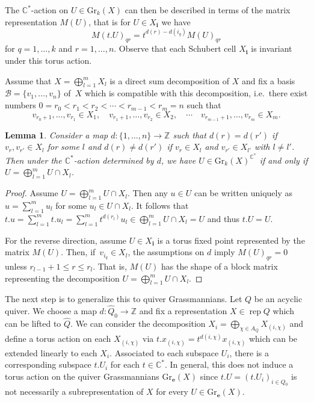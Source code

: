 \documentclass{amsart}
\newtheorem{lemma}[theorem]{Lemma}
\numberwithin{equation}{section}
\newcommand{\C}{\mathbb{C}}
\newcommand{\CC}{\mathbb{C}}
\newcommand{\ZZ}{\mathbb{Z}}
\newcommand{\bfe}{\mathbf{e}}
\newcommand{\bfi}{\mathbf{i}}
\newcommand{\Gr}{\mathrm{Gr}}
\newcommand{\rep}{\operatorname{rep}}
\begin{document}
The $\C^\ast$-action on $U\in\Gr_k(X)$ can then be described in terms of the matrix representation $M(U)$, that is for $U\in X_\bfi$ we have
\[M(t.U)_{qr}=t^{d(r)-d(i_q)} M(U)_{qr}\]
for $q=1,\ldots,k$ and $r=1,\ldots,n$.
Observe that each Schubert cell $X_\bfi$ is invariant under this torus action.

Assume that $X=\bigoplus_{l=1}^m X_l$ is a direct sum decomposition of $X$ and fix a basis $\mathcal B=\{v_1,\ldots,v_n\}$ of~$X$ which is compatible with this decomposition, i.e.\ there exist numbers $0=r_0<r_1<r_2<\cdots<r_{m-1}<r_m=n$ such that
\[v_{r_0+1},\ldots,v_{r_1}\in X_1,\quad v_{r_1+1},\ldots,v_{r_2}\in X_2,\quad\cdots\quad v_{r_{m-1}+1},\ldots,v_{r_m}\in X_m.\]
\begin{lemma}
  \label{le:usualGrass}
  Consider a map $d:\{1,\ldots,n\}\to\ZZ$ such that $d(r)=d(r')$ if $v_r,v_{r'}\in X_l$ for some $l$ and $d(r)\neq d(r')$ if $v_r\in X_l$ and $v_{r'}\in X_{l'}$ with $l\neq l'$.
  Then under the $\CC^*$-action determined by $d$, we have $U\in\Gr_k(X)^{\C^\ast}$ if and only if $U=\bigoplus_{l=1}^m U\cap X_l$.
\end{lemma}
\begin{proof}
  Assume $U=\bigoplus_{l=1}^m U\cap X_l$.
  Then any $u\in U$ can be written uniquely as $u=\sum_{l=1}^m u_l$ for some $u_l\in U\cap X_l$.
  It follows that $t.u=\sum_{l=1}^m t.u_l=\sum_{l=1}^m t^{d(r_l)}u_l\in\bigoplus_{l=1}^m U\cap X_l=U$ and thus $t.U=U$. 

  For the reverse direction, assume $U\in X_{\bfi}$ is a torus fixed point represented by the matrix $M(U)$.
  Then, if~$v_{i_q}\in X_l$, the assumptions on $d$ imply $M(U)_{qr}=0$ unless $r_{l-1}+1\le r\le r_l$.
  That is, $M(U)$ has the shape of a block matrix representing the decomposition $U=\bigoplus_{l=1}^m U\cap X_l$.
\end{proof}
The next step is to generalize this to quiver Grassmannians.
Let $Q$ be an acyclic quiver.
We choose a map $d:\hat Q_0\to\ZZ$ and fix a representation $X\in\rep Q$ which can be lifted to $\hat Q$.
We can consider the decomposition $X_i=\bigoplus_{\chi\in A_Q} X_{(i,\chi)}$ and define a torus action on each $X_{(i,\chi)}$ via $t.x_{(i,\chi)}=t^{d(i,\chi)}x_{(i,\chi)}$ which can be extended linearly to each $X_i$.
Associated to each subspace $U_i$, there is a corresponding subspace $t.U_i$ for each $t\in\CC^*$.
In general, this does not induce a torus action on the quiver Grassmannians $\Gr_\bfe(X)$ since $t.U=(t.U_i)_{i\in Q_0}$ is not necessarily a subrepresentation of $X$ for every $U\in\Gr_\bfe(X)$.
\end{document}
